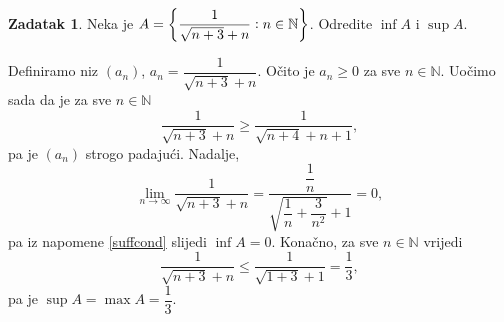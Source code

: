 \documentclass{book}
\let\originalleft\left
\let\originalright\right
\renewcommand{\left}{\mathopen{}\mathclose\bgroup\originalleft}
\renewcommand{\right}{\aftergroup\egroup\originalright}
\renewenvironment{proof}{%
    \vspace{-\parskip}\begin{oldproof}%
    }{%
    \end{oldproof}%
}
\theoremstyle{definition}
\theoremstyle{definition}
\newtheorem{exercise}{Zadatak}
\theoremstyle{remark}
\begin{document}
\begin{exercise}
Neka je $A=\left\{\dfrac{1}{\sqrt{n+3}+n} : n\in \mathbb{N}\right\}$. Odredite $\inf{A}$ i $\sup{A}$.
\end{exercise}
\begin{proof}[Rješenje]
Definiramo niz $(a_n)$, $a_n=\dfrac{1}{\sqrt{n+3}+n}$. Očito je $a_n\geq 0$ za sve $n\in \mathbb{N}$. Uočimo sada da je za sve $n\in \mathbb{N}$
$$\dfrac{1}{\sqrt{n+3}+n}\geq \dfrac{1}{\sqrt{n+4}+n+1},$$
pa je $(a_n)$ strogo padajući. Nadalje,
$$\lim\limits_{n\to \infty}{\dfrac{1}{\sqrt{n+3}+n}}=\dfrac{\dfrac{1}{n}}{\sqrt{\dfrac{1}{n}+\dfrac{3}{n^2}}+1}=0,$$
pa iz napomene \ref{suffcond} slijedi $\inf{A}=0$. Konačno, za sve $n\in \mathbb{N}$ vrijedi
$$\dfrac{1}{\sqrt{n+3}+n}\leq \dfrac{1}{\sqrt{1+3}+1}=\dfrac{1}{3},$$
pa je $\sup{A}=\max{A}=\dfrac{1}{3}$.
\end{proof}
\end{document}
